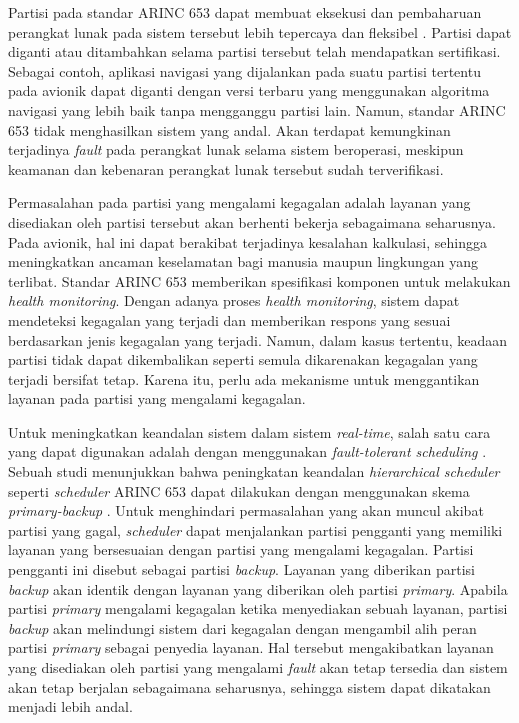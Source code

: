 Partisi pada standar ARINC 653 dapat membuat eksekusi dan pembaharuan perangkat lunak pada
sistem tersebut lebih tepercaya dan fleksibel \citep{Jin2013}.  Partisi dapat diganti atau
ditambahkan selama partisi tersebut telah mendapatkan sertifikasi. Sebagai contoh, aplikasi
navigasi yang dijalankan pada suatu partisi tertentu pada avionik dapat diganti dengan versi
terbaru yang menggunakan algoritma navigasi yang lebih baik tanpa mengganggu partisi lain.
Namun, standar ARINC 653 tidak menghasilkan sistem yang andal. Akan terdapat kemungkinan
terjadinya \textit{fault} pada perangkat lunak selama sistem beroperasi, meskipun keamanan dan
kebenaran perangkat lunak tersebut sudah terverifikasi. 

Permasalahan pada partisi yang mengalami kegagalan adalah layanan yang disediakan oleh partisi
tersebut akan berhenti bekerja sebagaimana seharusnya. Pada avionik, hal ini dapat berakibat
terjadinya kesalahan kalkulasi, sehingga meningkatkan ancaman keselamatan bagi manusia maupun
lingkungan yang terlibat. Standar ARINC 653 memberikan spesifikasi komponen untuk melakukan
\textit{health monitoring}. Dengan adanya proses \textit{health monitoring}, sistem dapat
mendeteksi kegagalan yang terjadi dan memberikan respons yang sesuai berdasarkan jenis kegagalan
yang terjadi. Namun, dalam kasus tertentu, keadaan partisi tidak dapat dikembalikan seperti
semula dikarenakan kegagalan yang terjadi bersifat tetap. Karena itu, perlu ada mekanisme untuk
menggantikan layanan pada partisi yang mengalami kegagalan.

Untuk meningkatkan keandalan sistem dalam sistem \textit{real-time}, salah satu cara yang dapat
digunakan adalah dengan menggunakan \textit{fault-tolerant scheduling} \citep{Campbell1986}
\citep{Han2003} \citep{Shin2008}. Sebuah studi menunjukkan bahwa peningkatan keandalan
\textit{hierarchical scheduler} seperti \textit{scheduler} ARINC 653 dapat dilakukan dengan
menggunakan skema \textit{primary-backup} \citep{Hyun2012}. Untuk menghindari permasalahan yang
akan muncul akibat partisi yang gagal, \textit{scheduler} dapat menjalankan partisi pengganti
yang memiliki layanan yang bersesuaian dengan partisi yang mengalami kegagalan. Partisi pengganti
ini disebut sebagai partisi \textit{backup}. Layanan yang diberikan partisi \textit{backup} akan
identik dengan layanan yang diberikan oleh partisi \textit{primary}. Apabila partisi
\textit{primary} mengalami kegagalan ketika menyediakan sebuah layanan, partisi \textit{backup}
akan melindungi sistem dari kegagalan dengan mengambil alih peran partisi \textit{primary}
sebagai penyedia layanan. Hal tersebut mengakibatkan layanan yang disediakan oleh partisi yang
mengalami \textit{fault} akan tetap tersedia dan sistem akan tetap berjalan sebagaimana
seharusnya, sehingga sistem dapat dikatakan menjadi lebih andal.

